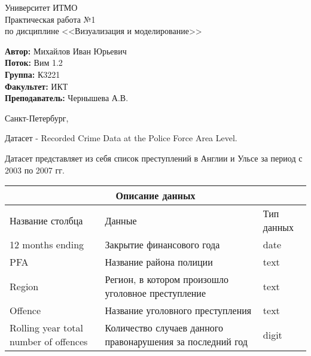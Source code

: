 \documentclass[12pt,a4paper]{article}
\begin{document}
	
	\begin{titlepage}
		
		\begin{center}
			\large Университет ИТМО\\[5cm]
			\LARGE Практическая работа №1\\
			\normalsize по дисциплине <<Визуализация и моделирование>>\\[5cm]
		\end{center}
		\begin{flushright}
			\begin{minipage}{0.6\textwidth}
				\begin{flushleft}
					\large
					\singlespacing 
					\textbf{Автор:} Михайлов Иван Юрьевич\\
					\textbf{Поток:} Вим 1.2\\
					\textbf{Группа:} К3221\\
					\textbf{Факультет:} ИКТ\\
					\textbf{Преподаватель:} Чернышева А.В.
				\end{flushleft}
			\end{minipage}
		\end{flushright}
		
		\vfill
		
		\begin{center}
			{\large Санкт-Петербург, \the{}}
		\end{center}
		
	\end{titlepage}
	\normalsize
	
	
	Датасет - Recorded Crime Data at the Police Force Area Level.\par
	Датасет представляет из себя список преступлений в Англии и Ульсе за период с 2003 по 2007 гг.
	
	\begin{tabular}{ |p{4cm}|p{6cm}|p{3cm}|  }
		\hline
		\multicolumn{3}{|c|}{Описание данных} \\
		\hline
		Название столбца& Данные &Тип данных\\
		\hline
		12 months ending& Закрытие финансового года& date\\
		PFA&Название района полиции& text\\
		Region&Регион, в котором произошло уголовное преступление& text\\
		Offence& Название уголовного преступления & text\\
		Rolling year total number of offences& Количество случаев данного правонарушения за последний год& digit\\
		\hline
	\end{tabular}
	
\end{document}
